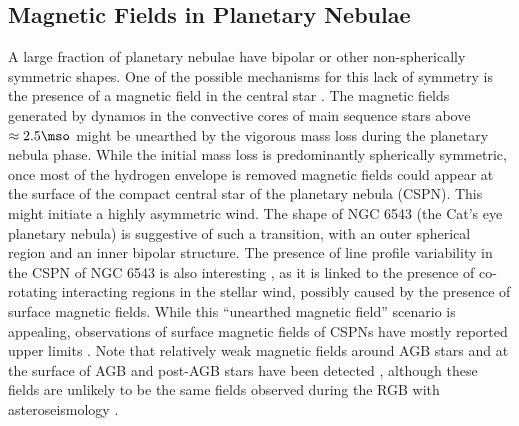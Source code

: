 \subsection{Magnetic Fields in Planetary Nebulae}
A large fraction of planetary nebulae have bipolar or other non-spherically symmetric shapes. 
One of the possible mechanisms for this lack of symmetry is the presence of a magnetic field in the central star \citep[See e.g.][]{Garc_a_Segura_1997,Chevalier_1994}. The magnetic fields generated by dynamos in the convective cores of main sequence stars above $\approx 2.5\mso$ might be unearthed by the vigorous mass loss during the planetary nebula phase. While the initial mass loss is predominantly spherically symmetric, once most of the hydrogen envelope is removed magnetic fields could appear at the surface of the compact central star of the planetary nebula (CSPN). This might initiate a highly asymmetric wind. The shape of NGC 6543 (the Cat's eye planetary nebula) is suggestive of such a transition, with an outer spherical region and an inner bipolar structure. The presence of line profile variability in the CSPN of NGC 6543 is also interesting \citep{Prinja_2012}, as it is linked to the presence of co-rotating interacting regions in the stellar wind, possibly caused by the presence of surface magnetic fields. While this ``unearthed magnetic field'' scenario is appealing, observations of surface magnetic fields of CSPNs have mostly reported upper limits \citep{Jordan_2012,Leone_2014,Asensio_Ramos_2014}. Note that relatively weak  magnetic fields around AGB stars \cite{Leal_Ferreira_2013} and at the surface of AGB and post-AGB stars have been detected \cite{L_bre_2014,Sabin_2014}, although these fields are unlikely to be the same fields observed during the RGB with asteroseismology \citep{Fuller_2015}. %


